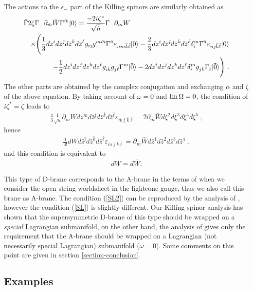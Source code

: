 \documentclass[a4paper,12pt]{article}
\numberwithin{equation}{section}
\newcommand{\del}{\partial}
\newcommand{\jb}{\bar{\jmath}}
\newcommand{\kb}{\bar{k}}
\newcommand{\lb}{\bar{\ell}}
\newcommand{\mb}{\bar{m}}
\newcommand{\nb}{\bar{n}}
\newcommand{\zb}{\bar{z}}
\newcommand{\ve}{\varepsilon}
\newcommand{\vac}{|0\rangle}
\newcommand{\vact}{|\tilde 0\rangle}
\DeclareMathOperator*{\im}{{\rm Im}}
\newcommand{\nn}{\nonumber\\}
\begin{document}
The actions to the $\epsilon_-$ part of the Killing spinors
are similarly obtained as
\begin{eqnarray}
 \lefteqn{\hat{\Gamma} 2 \zeta \Gamma_{-}\del_{\mb}\bar W\Gamma^{\mb}\vac
=  \frac{- 2 i \zeta^{*}}{\sqrt{h}} \Gamma_- \del_{m}W }\nn
&& \times\Bigg(
\frac13 dz^{i}d\zb^{\jb}d\zb^{\kb}d\zb^{\lb}g_{i\jb}g^{m\mb}\Gamma^{\nb}
               \ve_{\nb\mb\kb\lb}\vac
 -\frac23 dz^{i}d\zb^{\jb}d\zb^{\kb}d\zb^{\lb}\delta_{i}^{m}\Gamma^{\nb}
               \ve_{\nb\jb\kb\lb}\vac\nn
 &&\qquad
 -\frac12 dz^{i}dz^{j}d\zb^{\kb}d\zb^{\lb}g_{i\kb}g_{j\lb}\Gamma^{m}\vact
  - 2 dz^{i}dz^{j}d\zb^{\kb}d\zb^{\lb}\delta_{i}^{m}g_{j\kb}\Gamma_{\lb}\vact
\Bigg) ~.
\label{SLe-}
\end{eqnarray}
The other parts are obtained by the complex conjugation
 and exchanging $\alpha$ and $\zeta$ of the above equation.
By taking account of $\omega=0$ and $\im \Omega=0$, the condition of 
$i\zeta^{*}=\zeta$ leads to
\begin{eqnarray}
 \frac{4}{3} \frac{1}{\sqrt{h}}
\del_{m}W dz^{m}d\zb^{\jb}d\zb^{\kb}d\zb^{\lb}\ve_{\mb\jb\kb\lb} 
     = 2\del_{\mb}\bar W d\xi^{2}d\xi^{3}d\xi^{4}d\xi^{5}~,
\end{eqnarray}
hence
\begin{eqnarray}
 \frac{1}{3!} dW d\zb^{\jb}d\zb^{\kb}d\zb^{\lb}\ve_{\mb\jb\kb\lb}
  =\del_{\mb}\bar W d\zb^{1}d\zb^{2}d\zb^{3}d\zb^{4}~,
\end{eqnarray}
and this condition is equivalent to 
\begin{eqnarray}
 dW = d \bar W.
\label{SL2}
\end{eqnarray}

This type of D-brane corresponds to the A-brane in the terms of
\cite{Hori:2000ck} when we consider the open string worldsheet in the
lightcone gauge, thus we also call this brane as A-brane.
The condition (\ref{SL2}) can be reproduced by the analysis of
\cite{Hori:2000ck}, 
however the condition (\ref{SL}) is slightly different.
Our Killing spinor analysis has shown that the supersymmetric D-brane of
this type should be wrapped on a {\em special} Lagrangian submanifold, on the
other hand, the
analysis of \cite{Hori:2000ck} gives only the requirement that the
A-brane should be wrapped on a Lagrangian
(not necessarily special Lagrangian) submanifold ($\omega=0$).
Some comments on this point are given in section
\ref{section-conclusion}.

\subsection{Examples}
\end{document}
